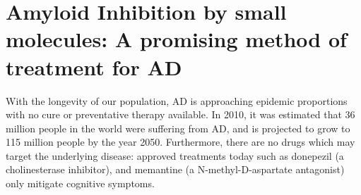 



\section{Amyloid Inhibition by small molecules: A promising method of treatment for AD} 

With the longevity of our population, AD is approaching epidemic proportions with no cure or preventative therapy available.\cite{Blennow:2006wd} In 2010, it was estimated that 36 million people in the world were suffering from AD, and is projected to grow to 115 million people by the year 2050.\cite{alzreport:2012} Furthermore, there are no drugs which may target the underlying disease: approved treatments today such as donepezil (a cholinesterase inhibitor), and memantine (a N-methyl-D-aspartate antagonist) only mitigate cognitive symptoms.\cite{Mangialasche:2010eg}


